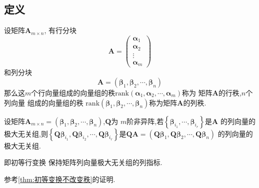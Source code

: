 \subsection{定义}
\begin{formal}
\begin{definition}[行秩与列秩]\label{def:行秩与列秩}
    设矩阵$\bm{A}_{m \times n}$,
    有行分块\[
    \bm{A}=\begin{pmatrix}
        \bm{\alpha}_1\\
        \bm{\alpha}_2\\
        \vdots\\
        \bm{\alpha}_m
    \end{pmatrix}
    \]
    和列分块
    \[
    \bm{A}=\left(
        \bm{\beta}_1,\bm{\beta}_2,\cdots,\bm{\beta}_n
    \right)
    \]
    那么这$m$个行向量组成的向量组的秩$\mathrm{rank}\left(
        \bm{\alpha}_1,\bm{\alpha}_2,\cdots,\bm{\alpha}_m
    \right)$称为
    矩阵$\bm{A}$的行秩,$n$个列向量
    组成的向量组的秩
    $\mathrm{rank}\left(
        \bm{\beta}_1,\bm{\beta}_2,\cdots,\bm{\beta}_n
    \right)$称为矩阵$\bm{A}$的列秩.
\end{definition}
\end{formal}
\begin{green}
\begin{lemma}[极大无关组的指标保持]\label{lem:极大无关组的指标保持}
    设矩阵$\bm{A}_{m \times n} = 
    \left(\bm{\beta}_1,\bm{\beta}_2,\cdots,
    \bm{\beta}_n\right)$,$\bm{Q}$为
    $m$阶非异阵,若$\left\{\bm{\beta}
    _{i_1},\cdots,
    \bm{\beta}_{i_r}\right\}$是$\bm{A}$
    的列向量的极大无关组,则$
    \left\{
        \bm{Q}\bm{\beta}_{i_1},\bm{Q\beta}_{i_2}
        ,\cdots,
        \bm{Q}\bm{\beta}_{i_r}
    \right\}$是$\bm{QA}
    = \left(\bm{Q}\bm{\beta}_1,\bm{Q\beta}_{2},\cdots
    ,\bm{Q}\bm{\beta}_n\right)$
    的列向量的极大无关组.

    即初等行变换
保持矩阵列向量极大无关组的列指标.
\end{lemma}
\begin{Proof}
参考\cref{thm:初等变换不改变秩}的证明.
\end{Proof}
\end{green}

